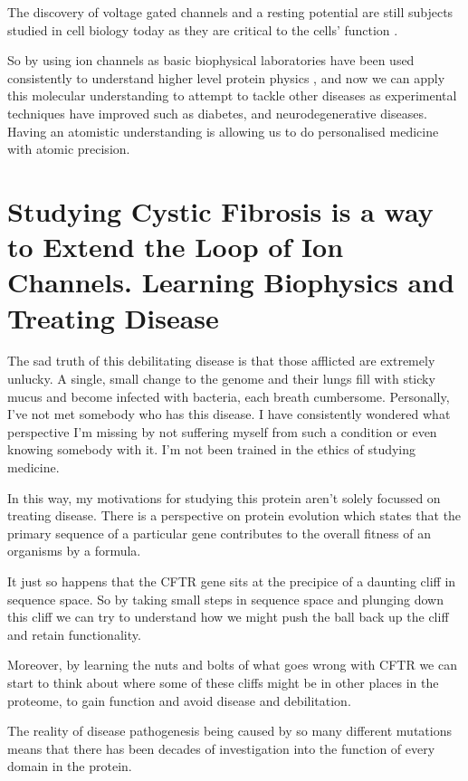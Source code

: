 The discovery of voltage gated channels and a resting potential are still subjects studied in cell biology today as they are critical to the cells' function \cite{}.

So by using ion channels as basic biophysical laboratories have been used consistently to understand higher level protein physics \cite{}, and now we can apply this molecular understanding to attempt to tackle other diseases as experimental techniques have improved such as diabetes, and neurodegenerative diseases. Having an atomistic understanding is allowing us to do personalised medicine with atomic precision.

\section{Studying Cystic Fibrosis is a way to Extend the Loop of Ion Channels. Learning Biophysics and Treating Disease}

The sad truth of this debilitating disease is that those afflicted are extremely unlucky. A single, small change to the genome and their lungs fill with sticky mucus and become infected with bacteria, each breath cumbersome. Personally, I've not met somebody who has this disease. I have consistently wondered what perspective I'm missing by not suffering myself from such a condition or even knowing somebody with it. I'm not been trained in the ethics of studying medicine.

In this way, my motivations for studying this protein aren't solely focussed on treating disease. There is a perspective on protein evolution which states that the primary sequence of a particular gene contributes to the overall fitness of an organisms by a formula. \cite{}


It just so happens that the CFTR gene sits at the precipice of a daunting cliff in sequence space. So by taking small steps in sequence space and plunging down this cliff we can try to understand how we might push the ball back up the cliff and retain functionality.

Moreover, by learning the nuts and bolts of what goes wrong with CFTR we can start to think about where some of these cliffs might be in other places in the proteome, to gain function and avoid disease and debilitation.

The reality of disease pathogenesis being caused by so many different mutations means that there has been decades of investigation into the function of every domain in the protein. 


